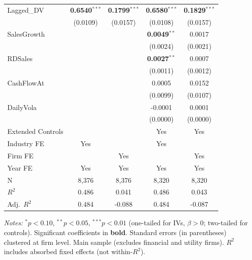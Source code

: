 \documentclass[11pt,a4paper]{article}
\begin{document}
\begin{table}[htbp]
\begin{tabular}{lcccc}
Lagged\_DV & \textbf{0.6540}$^{***}$ & \textbf{0.1799}$^{***}$ & \textbf{0.6580}$^{***}$ & \textbf{0.1829}$^{***}$ \\
 & (0.0109) & (0.0157) & (0.0108) & (0.0157) \\
SalesGrowth &  &  & \textbf{0.0049}$^{**}$ & 0.0017 \\
 &  &  & (0.0024) & (0.0021) \\
RDSales &  &  & \textbf{0.0027}$^{**}$ & 0.0007 \\
 &  &  & (0.0011) & (0.0012) \\
CashFlowAt &  &  & 0.0005 & 0.0152 \\
 &  &  & (0.0099) & (0.0107) \\
DailyVola &  &  & -0.0001 & 0.0001 \\
 &  &  & (0.0000) & (0.0000) \\
\midrule
Extended Controls &  &  & Yes & Yes \\
Industry FE & Yes &  & Yes &  \\
Firm FE &  & Yes &  & Yes \\
Year FE & Yes & Yes & Yes & Yes \\
\midrule
N & 8,376 & 8,376 & 8,320 & 8,320 \\
$R^2$ & 0.486 & 0.041 & 0.486 & 0.043 \\
Adj.~$R^2$ & 0.484 & -0.088 & 0.484 & -0.087 \\
\bottomrule
\end{tabular}
\begin{minipage}{\linewidth}
\vspace{2pt}\scriptsize
\textit{Notes:} $^{*}p<0.10$, $^{**}p<0.05$, $^{***}p<0.01$ (one-tailed for IVs, $\beta > 0$; two-tailed for controls).
 Significant coefficients in \textbf{bold}.
 Standard errors (in parentheses) clustered at firm level.
 Main sample (excludes financial and utility firms).
 $R^2$ includes absorbed fixed effects (not within-$R^2$).
\end{minipage}
\end{table}
\clearpage
\end{document}
